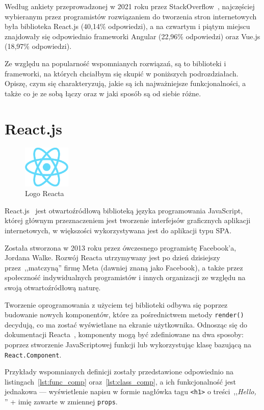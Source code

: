 \documentclass[twoside,a4paper]{report}
\begin{document}
Według ankiety przeprowadzonej w 2021 roku przez StackOverflow~\cite{stacksurvey}, najczęściej wybieranym przez programistów rozwiązaniem do tworzenia stron internetowych była biblioteka React.js (40,14\% odpowiedzi), a na czwartym i piątym miejscu znajdowały się odpowiednio frameworki Angular (22,96\% odpowiedzi) oraz Vue.js (18,97\% odpowiedzi).

Ze względu na popularność wspomnianych rozwiązań, są to biblioteki i frameworki, na których chciałbym się skupić w poniższych podrozdziałach.
Opiszę, czym się charakteryzują, jakie są ich najważniejsze funkcjonalności, a także co je ze sobą łączy oraz w jaki sposób są od siebie różne.

\section{React.js}
\begin{figure}
    \centering
    \includegraphics[width=0.2\textwidth]{img/logo_react.png}
    \caption*{Logo Reacta}\label{fig:logo_react}
\end{figure}
React.js~\cite{react} jest otwartoźródłową biblioteką języka programowania JavaScript, której głównym przeznaczeniem jest tworzenie interfejsów graficznych aplikacji internetowych, w większości wykorzystywana jest do aplikacji typu SPA\@.

Została stworzona w 2013 roku przez ówczesnego programistę Facebook'a, Jordana Walke.
Rozwój Reacta utrzymywany jest po dzień dzisiejszy przez~,,matczyną'' firmę Meta (dawniej znaną jako Facebook), a także przez społeczność indywidualnych programistów i innych organizacji ze względu na swoją otwartoźródłową naturę.

Tworzenie oprogramowania z użyciem tej biblioteki odbywa się poprzez budowanie nowych komponentów, które za pośrednictwem metody \texttt{render()} decydują, co ma zostać wyświetlane na ekranie użytkownika.
Odnosząc się do dokumentacji Reacta~\cite{reactdocs}, komponenty mogą być zdefiniowane na dwa sposoby: poprzez stworzenie JavaScriptowej funkcji lub wykorzystując klasę bazującą na \texttt{React.Component}.

Przykłady wspomnianych definicji zostały przedstawione odpowiednio na listingach~\ref{lst:func_comp} oraz~\ref{lst:class_comp}, a ich funkcjonalność jest jednakowa --- wyświetlenie napisu w formie nagłówka tagu \texttt{<h1>} o treści~,,\textit{Hello, }'' + imię zawarte w zmiennej \texttt{props}.
\end{document}
